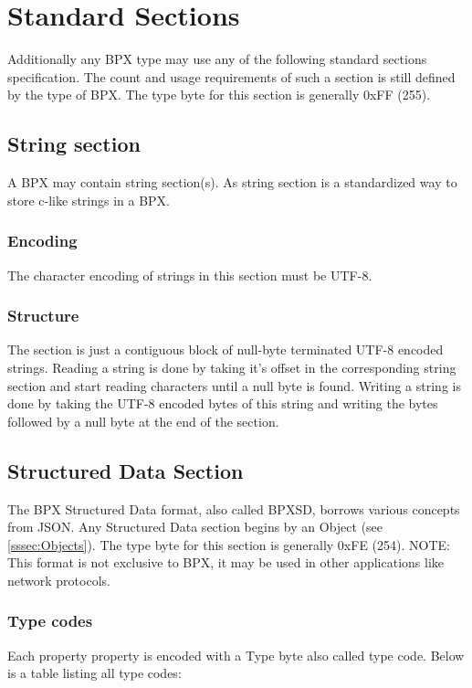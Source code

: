 \section{Standard Sections}

Additionally any BPX type may use any of the following standard sections specification. The count and usage requirements of such a section is still defined by the type of BPX. The type byte for this section is generally 0xFF (255).

\subsection{String section} \label{ssec:Strings}
A BPX may contain string section(s). As string section is a standardized way to store c-like strings in a BPX.

\subsubsection{Encoding}
The character encoding of strings in this section must be UTF-8.

\subsubsection{Structure}
The section is just a contiguous block of null-byte terminated UTF-8 encoded strings.\newline
Reading a string is done by taking it's offset in the corresponding string section and start reading characters until a null byte is found.\newline
Writing a string is done by taking the UTF-8 encoded bytes of this string and writing the bytes followed by a null byte at the end of the section.

\subsection{Structured Data Section} \label{ssec:Structured}
The BPX Structured Data format, also called BPXSD, borrows various concepts from JSON. Any Structured Data section begins by an Object (see \ref{sssec:Objects}). The type byte for this section is generally 0xFE (254).\newline
NOTE: This format is not exclusive to BPX, it may be used in other applications like network protocols.

\subsubsection{Type codes}
Each property property is encoded with a Type byte also called type code.  Below is a table listing all type codes:

